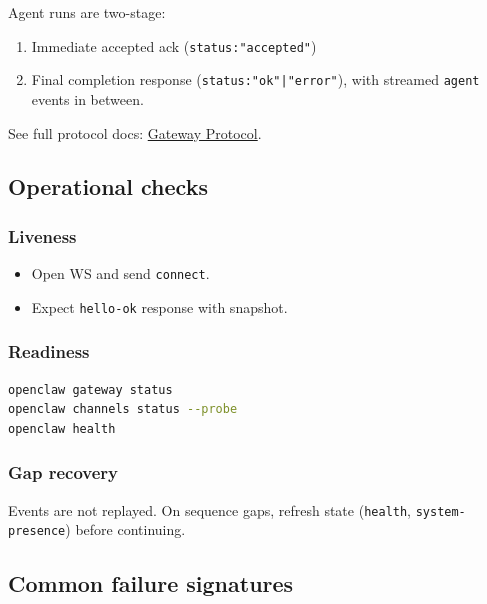 Agent runs are two-stage:

\begin{enumerate}
  \item Immediate accepted ack (\texttt{status:"accepted"})
  \item Final completion response (\texttt{status:"ok"|"error"}), with streamed \texttt{agent} events in between.
\end{enumerate}


See full protocol docs: \href{/gateway/protocol}{Gateway Protocol}.

\subsection{Operational checks}


\subsubsection{Liveness}


\begin{itemize}
  \item Open WS and send \texttt{connect}.
  \item Expect \texttt{hello-ok} response with snapshot.
\end{itemize}


\subsubsection{Readiness}


\begin{lstlisting}[language=bash]
openclaw gateway status
openclaw channels status --probe
openclaw health
\end{lstlisting}


\subsubsection{Gap recovery}


Events are not replayed. On sequence gaps, refresh state (\texttt{health}, \texttt{system-presence}) before continuing.

\subsection{Common failure signatures}



